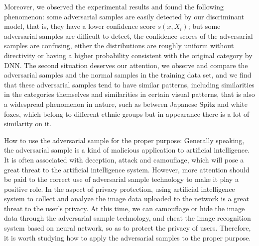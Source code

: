 \documentclass{ieeeaccess}
\begin{document}
Moreover, we observed the experimental results and found the following phenomenon: some adversarial samples are easily detected by our discriminant model, that is, they have a lower confidence score $s(x,X_i)$; but some adversarial samples are difficult to detect, the confidence scores of the adversarial samples are confusing, either the distributions are roughly uniform without directivity or having a higher probability consistent with the original category by DNN. The second situation deserves our attention, we observe and compare the adversarial samples and the normal samples in the training data set, and we find that these adversarial samples tend to have similar patterns, including similarities in the categories themselves and similarities in certain visual patterns, that is also a widespread phenomenon in nature, such as between Japanese Spitz and white foxes, which belong to different ethnic groups but in appearance there is a lot of similarity on it.

How to use the adversarial sample for the proper purpose: Generally speaking, the adversarial sample is a kind of malicious application to artificial intelligence. It is often associated with deception, attack and camouflage, which will pose a great threat to the artificial intelligence system. However, more attention should be paid to the correct use of adversarial sample technology to make it play a positive role. In the aspect of privacy protection, using artificial intelligence system to collect and analyze the image data uploaded to the network is a great threat to the user's privacy. At this time, we can camouflage or hide the image data through the adversarial sample technology, and cheat the image recognition system based on neural network, so as to protect the privacy of users. Therefore, it is worth studying how to apply the adversarial samples to the proper purpose.
\end{document}
